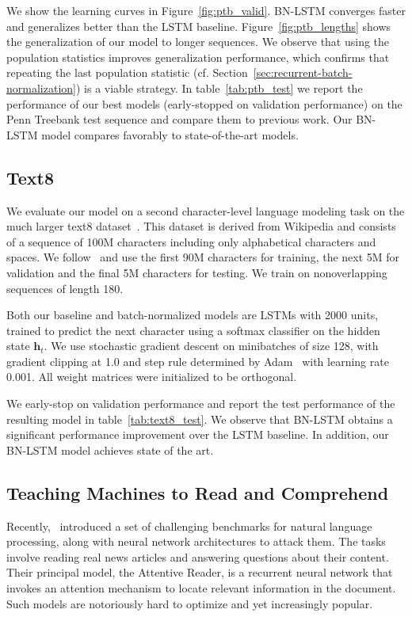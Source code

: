 \documentclass{article} %
\newcommand{\vect}[1]{\mathbf{#1}}
\begin{document}
We show the learning curves in Figure~\ref{fig:ptb_valid}.
BN-LSTM converges faster and generalizes better than the LSTM baseline.
Figure~\ref{fig:ptb_lengths} shows the generalization of our model to longer sequences.
We observe that using the population statistics improves generalization performance,
which confirms that repeating the last population statistic (cf. Section~\ref{sec:recurrent-batch-normalization})
is a viable strategy.
In table~\ref{tab:ptb_test} we report the performance of our best models (early-stopped on validation performance)
on the Penn Treebank test sequence and compare them to previous work.
Our BN-LSTM model compares favorably to state-of-the-art models.

\subsection{Text8}

We evaluate our model on a second character-level language modeling task on the much larger text8 dataset~\citep{mahoney2009large}.
This dataset is derived from Wikipedia and consists of a sequence of 100M characters including only alphabetical characters and spaces.
We follow~\citet{mikolov2012subword,zhang2016architectural} and use the first 90M characters for training, the next 5M for validation and the final 5M characters for testing.
We train on nonoverlapping sequences of length 180.

Both our baseline and batch-normalized models are LSTMs with 2000 units, trained to predict the next character using a softmax classifier
on the hidden state $\vect{h}_t$. We use stochastic gradient descent on minibatches of size 128,
with gradient clipping at 1.0 and step rule determined by Adam~\citep{kingma2014adam}
with learning rate 0.001.
All weight matrices were initialized to be orthogonal.

We early-stop on validation performance and report the test performance of the resulting model in table~\ref{tab:text8_test}.
We observe that BN-LSTM obtains a significant performance improvement over the LSTM baseline. In addition, our BN-LSTM  model achieves state of the art.

\subsection{Teaching Machines to Read and Comprehend}
\label{sec:less-attr}

Recently,~\citep{attentivereader} introduced a set of challenging benchmarks for natural language processing, along with neural network architectures to attack them.
The tasks involve reading real news articles and answering questions about their content.
Their principal model, the Attentive Reader, is a recurrent neural network that invokes an attention mechanism to locate relevant information in the document.
Such models are notoriously hard to optimize and yet increasingly popular.
\end{document}
